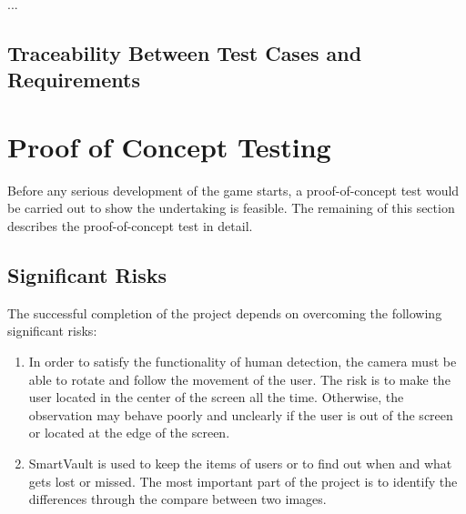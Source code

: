 \documentclass[12pt, titlepage]{article}
\begin{document}
...

\subsection{Traceability Between Test Cases and Requirements}

\section{Proof of Concept Testing}
Before any serious development of the game starts, a proof-of-concept test would be carried out to show the undertaking is feasible. The remaining of this section describes the proof-of-concept test in detail.

\subsection{Significant Risks}
The successful completion of the project depends on overcoming the following significant risks:
\begin{enumerate}
\item{}
In order to satisfy the functionality of human detection, the camera must be able to rotate and follow the movement of the user. The risk is to make the user located in the center of the screen all the time. Otherwise, the observation may behave poorly and unclearly if the user is out of the screen or located at the edge of the screen.			
\item{}
SmartVault is used to keep the items of users or to find out when and what gets lost or missed. The most important part of the project is to identify the differences through the compare between two images.
\end{enumerate}
\end{document}
